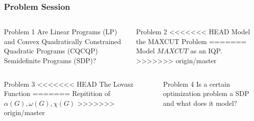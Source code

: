 \documentclass[11pt]{beamer}
\begin{document}
	\begin{frame}
		\frametitle{Problem Session}
		\begin{columns}
			\begin{column}{0.5\textwidth}
				\begin{block}{Problem 1}
					Are Linear Programs (LP) and Convex Quadratically Constrained Quadratic Programs (CQCQP) Semidefinite Programs (SDP)?
				\end{block}
			\end{column}
			\begin{column}{0.5\textwidth}
				\begin{block}{Problem 2}
<<<<<<< HEAD
					\vspace{5.9ex}
					Model the MAXCUT Problem
					\vspace{6ex}
=======
					Model $MAX CUT$ as an IQP.
>>>>>>> origin/master
				\end{block}
			\end{column}
		\end{columns}
		\begin{columns}
			\begin{column}{0.5\textwidth}
				\begin{block}{Problem 3}
<<<<<<< HEAD
					\vspace{5.9ex}
					The Lovasz Function
					\vspace{6ex}
=======
					Repitition of $\alpha(G), \omega(G), \chi(G)$
>>>>>>> origin/master
				\end{block}
			\end{column}
			\begin{column}{0.5\textwidth}
				\begin{block}{Problem 4}
					\vspace{4.4ex} Is a certain optimization problem a SDP and what does it model?\vspace{4.5ex}
				\end{block}
			\end{column}
		\end{columns}
	\end{frame}
\end{document}
